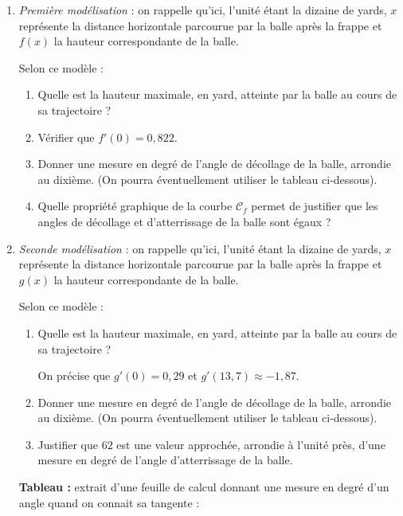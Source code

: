 \documentclass[10pt,a4paper]{article}
\begin{document}
\begin{enumerate}
\item \emph{Première modélisation} : on rappelle qu'ici, l'unité étant la dizaine de yards, $x$ représente la distance horizontale parcourue par la balle après la frappe et $f(x)$ la hauteur correspondante de la balle.

Selon ce modèle :
	\begin{enumerate}
		\item Quelle est la hauteur maximale, en yard, atteinte par la balle au cours de sa trajectoire ?
		\item Vérifier que $f'(0) = 0,822$.
		\item Donner une mesure en degré de l'angle de décollage de la balle, arrondie au dixième. (On pourra éventuellement utiliser le tableau ci-dessous).
		\item Quelle propriété graphique de la courbe $\mathcal{C}_f$ permet de justifier que les angles de décollage et d'atterrissage de la balle sont égaux ?
	\end{enumerate}
\item \emph{Seconde modélisation } : on rappelle qu'ici, l'unité étant la dizaine de yards, $x$ représente la distance horizontale parcourue par la balle après la frappe et $g(x)$ la hauteur correspondante de la balle.

Selon ce modèle :

	\begin{enumerate}
		\item Quelle est la hauteur maximale, en yard, atteinte par la balle au cours de sa trajectoire ?

On précise que $g'(0) = 0,29$ et $g'(13,7) \approx -1,87$.
		\item Donner une mesure en degré de l'angle de décollage de la balle, arrondie au dixième. (On pourra éventuellement utiliser le tableau ci-dessous).
		\item Justifier que $62$ est une valeur approchée, arrondie à l'unité près, d'une mesure en degré de l'angle d'atterrissage de la balle.
	\end{enumerate}
\medskip

\textbf{Tableau :} extrait d'une feuille de calcul donnant une mesure en degré d'un angle quand on connait sa tangente :


\end{enumerate}
\end{document}
